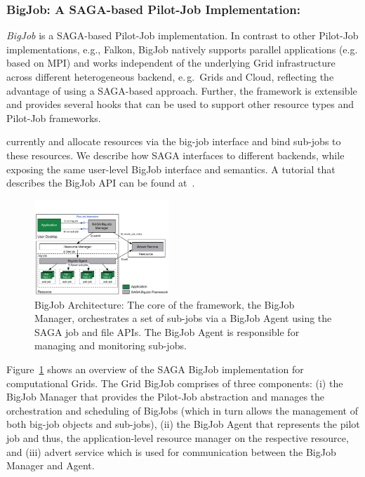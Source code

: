     \subsubsection{BigJob: A SAGA-based Pilot-Job Implementation:}

    \emph{BigJob} is a SAGA-based Pilot-Job implementation. In contrast
    to other Pilot-Job implementations, e.g., Falkon, BigJob natively
    supports parallel applications (e.g. based on MPI) and works
    independent of the underlying Grid infrastructure across different
    heterogeneous backend, e.\,g.\ Grids and Cloud, reflecting the
    advantage of using a SAGA-based approach. Further, the framework is
    extensible and provides several hooks that can be used to support
    other resource types and Pilot-Job frameworks.

    currently %
    and %
    allocate resources via the big-job interface and bind sub-jobs to
    these resources.  We describe how SAGA interfaces to different
    backends, while exposing the same user-level BigJob interface and
    semantics.  A tutorial that describes the BigJob API can be found
    at~\cite{bigjob_cloud_tutorial}.

\begin{figure}[ht]
    \centering
    \includegraphics[width=0.45\textwidth]{figures/bigjob}
    \caption{BigJob Architecture: The core of the framework, the
      BigJob Manager, orchestrates a set of sub-jobs via a BigJob
      Agent using the SAGA job and file APIs.  The BigJob Agent is
      responsible for managing and monitoring sub-jobs.\up}
   \label{fig:figures_bigjob}
\end{figure}

    \vspace{0.1in}
    Figure~\ref{fig:figures_bigjob} shows an overview of the SAGA BigJob
    implementation for computational Grids. The Grid BigJob comprises of
    three components: (i) the BigJob Manager that provides the Pilot-Job
    abstraction and manages the orchestration and scheduling of BigJobs
    (which in turn allows the management of both big-job objects and
    sub-jobs), (ii) the BigJob Agent that represents the pilot job and
    thus, the application-level resource manager on the respective
    resource, and (iii) advert service which is used for communication
    between the BigJob Manager and Agent.


